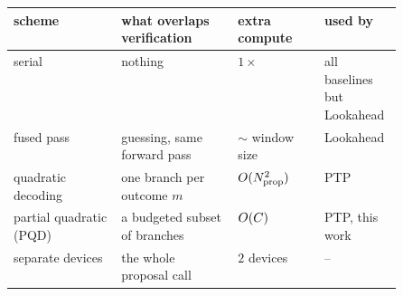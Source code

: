 {\setlength{\tabcolsep}{3pt}\footnotesize
\begin{tabular}{@{}l p{0.30\linewidth} l p{0.20\linewidth}@{}}
\toprule
scheme & what overlaps verification & extra compute & used by \\
\midrule
serial & nothing & $1\times$ & all baselines but Lookahead \\
fused pass & guessing, same forward pass & $\sim$ window size & Lookahead \\
quadratic decoding & one branch per outcome $m$ & $O(N_{\mathrm{prop}}^2)$ & PTP \\
partial quadratic (PQD) & a budgeted subset of branches & $O(C)$ & PTP, this work \\
separate devices & the whole proposal call & $2$ devices & -- \\
\bottomrule
\end{tabular}}
